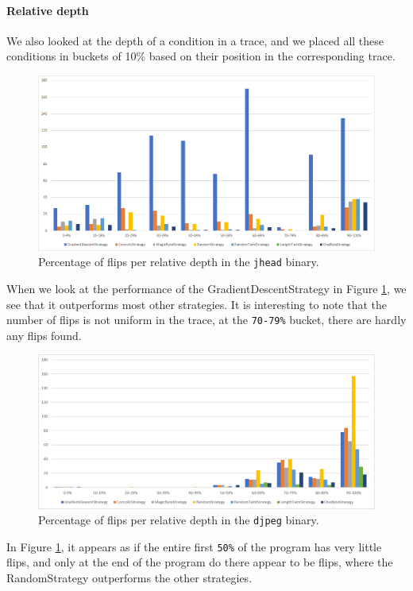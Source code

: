 \paragraph{Relative depth}
We also looked at the depth of a condition in a trace, and we placed all these conditions in buckets of 10\% based on their position in the corresponding trace.
\begin{figure}[H]
    \centering
    \includegraphics[width=.8\linewidth]{5_results/graphs/jhead-depth-relative.png}  
    \caption{Percentage of flips per relative depth in the \texttt{jhead} binary.}
    \label{fig:jheadDepthRelative}
\end{figure}
When we look at the performance of the GradientDescentStrategy in Figure \ref{fig:jheadDepthRelative}, we see that it outperforms most other strategies. It is interesting to note that the number of flips is not uniform in the trace, at the \texttt{70-79\%} bucket, there are hardly any flips found.

\begin{figure}[H]
    \centering
    \includegraphics[width=.8\linewidth]{5_results/graphs/djpeg-depth-relative.png}  
    \caption{Percentage of flips per relative depth in the \texttt{djpeg} binary.}
    \label{fig:djpegDepthRelative}
\end{figure}
In Figure \ref{fig:jheadDepthRelative}, it appears as if the entire first \texttt{50\%} of the program has very little flips, and only at the end of the program do there appear to be flips, where the RandomStrategy outperforms the other strategies.



